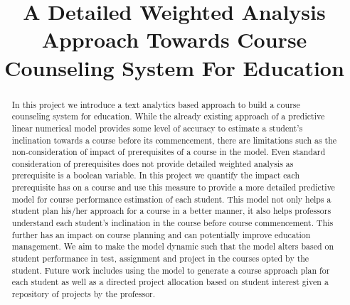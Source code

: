 \documentclass[conference]{IEEEtran}
\begin{document}
	\title{A Detailed Weighted Analysis Approach Towards Course Counseling System For Education}
    	\author{
		}
	\maketitle
	\begin{abstract}
In this project we introduce a text analytics based approach to build a course counseling system for education. While the already existing approach of a predictive linear numerical model provides some level of accuracy to estimate a student's inclination towards a course before its commencement, there are limitations such as the non-consideration of impact of prerequisites of a course in the model. Even standard consideration of prerequisites does not provide detailed weighted analysis as prerequisite is a boolean variable. In this project we quantify the impact each prerequisite has on a course and use this measure to provide a more detailed predictive model for course performance estimation of each student. This model not only helps a student plan his/her approach for a course in a better manner, it also helps professors understand each student's inclination in the course before course commencement. This further has an impact on course planning and can potentially improve education management. We aim to make the model dynamic such that the model alters based on student performance in test, assignment and project in the courses opted by the student. Future work includes using the model to generate a course approach plan for each student as well as a directed project allocation based on student interest given a repository of projects by the professor.
	\end{abstract}

\end{document}
